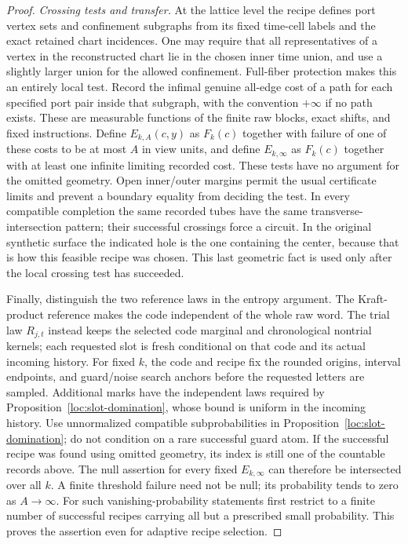 \begin{proof}
\smallskip\noindent\emph{Crossing tests and transfer.}
At the lattice level the recipe defines port vertex sets and confinement
subgraphs from its fixed time-cell labels and the exact retained chart
incidences.  One may require that all representatives of a vertex in the
reconstructed chart lie in the chosen inner time union, and use a
slightly larger union for the allowed confinement.  Full-fiber
protection makes this an entirely local test.  Record the infimal genuine
all-edge cost of a path for each specified port pair inside that
subgraph, with the convention $+\infty$ if no path exists.  These are
measurable functions of the finite raw blocks, exact shifts, and fixed
instructions.  Define $E_{k,A}(c,y)$ as $F_k(c)$ together with failure of
one of these costs to be at most $A$ in view units, and define
$E_{k,\infty}$ as $F_k(c)$ together with at least one infinite limiting
recorded cost.  These tests have no argument
for the omitted geometry.  Open inner/outer margins permit the usual
certificate limits and prevent a boundary equality from deciding the
test.  In every compatible completion the same recorded tubes have the
same transverse-intersection pattern; their successful crossings force
a circuit.  In the original synthetic surface the indicated hole is the
one containing the center, because that is how this feasible recipe was
chosen.  This last geometric fact is used only after the local crossing
test has succeeded.

Finally, distinguish the two reference laws in the entropy argument.
The Kraft-product reference makes the code independent of the whole raw
word.  The trial law $R_{j,t}$ instead keeps the selected code marginal
and chronological nontrial kernels; each requested slot is fresh
conditional on that code and its actual incoming history.  For fixed
$k$, the code and recipe fix the rounded origins, interval endpoints,
and guard/noise search anchors before the requested letters are sampled.
Additional marks have the independent laws required by
Proposition~\ref{loc:slot-domination}, whose bound is uniform in the
incoming history.  Use unnormalized compatible
subprobabilities in Proposition~\ref{loc:slot-domination}; do not condition
on a rare successful guard atom.  If the successful recipe was found
using omitted geometry, its index is still one of the countable records
above.  The null assertion for every fixed $E_{k,\infty}$ can therefore
be intersected over all $k$.  A finite threshold failure need not be
null; its probability tends to zero as $A\to\infty$.  For such
vanishing-probability statements first
restrict to a finite number of successful recipes carrying all but a
prescribed small probability.  This proves the assertion even for
adaptive recipe selection.
\end{proof}

